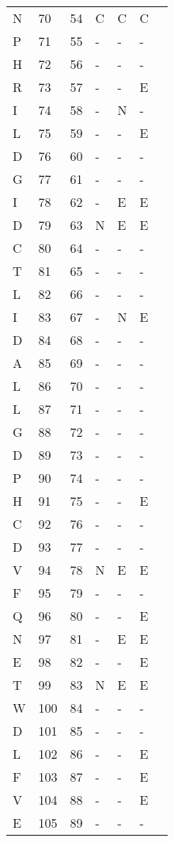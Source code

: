 \documentclass[10pt]{article}
\begin{document}
\begin{longtable}{lllllll}
  N &  70 & 54 & C & C & C &  \\ 
  P &  71 & 55 & - & - & - &  \\ 
  H &  72 & 56 & - & - & - &  \\ 
  R &  73 & 57 & - & - & E &  \\ 
  I &  74 & 58 & - & N & - &  \\ 
  L &  75 & 59 & - & - & E &  \\ 
  D &  76 & 60 & - & - & - &  \\ 
  G &  77 & 61 & - & - & - &  \\ 
  I &  78 & 62 & - & E & E &  \\ 
  D &  79 & 63 & N & E & E &  \\ 
  C &  80 & 64 & - & - & - &  \\ 
  T &  81 & 65 & - & - & - &  \\ 
  L &  82 & 66 & - & - & - &  \\ 
  I &  83 & 67 & - & N & E &  \\ 
  D &  84 & 68 & - & - & - &  \\ 
  A &  85 & 69 & - & - & - &  \\ 
  L &  86 & 70 & - & - & - &  \\ 
  L &  87 & 71 & - & - & - &  \\ 
  G &  88 & 72 & - & - & - &  \\ 
  D &  89 & 73 & - & - & - &  \\ 
  P &  90 & 74 & - & - & - &  \\ 
  H &  91 & 75 & - & - & E &  \\ 
  C &  92 & 76 & - & - & - &  \\ 
  D &  93 & 77 & - & - & - &  \\ 
  V &  94 & 78 & N & E & E &  \\ 
  F &  95 & 79 & - & - & - &  \\ 
  Q &  96 & 80 & - & - & E &  \\ 
  N &  97 & 81 & - & E & E &  \\ 
  E &  98 & 82 & - & - & E &  \\ 
  T &  99 & 83 & N & E & E &  \\ 
  W & 100 & 84 & - & - & - &  \\ 
  D & 101 & 85 & - & - & - &  \\ 
  L & 102 & 86 & - & - & E &  \\ 
  F & 103 & 87 & - & - & E &  \\ 
  V & 104 & 88 & - & - & E &  \\ 
  E & 105 & 89 & - & - & - &  \\ 

\end{longtable}
\end{document}
